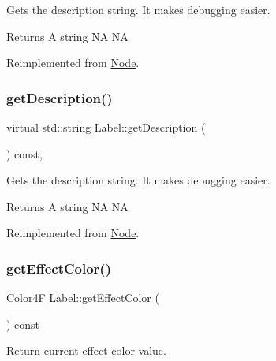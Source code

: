 Gets the description string. It makes debugging easier. \begin{DoxyReturn}{Returns}
A string  NA  NA 
\end{DoxyReturn}


Reimplemented from \hyperlink{classNode_a41710375a0d92a4ee54c39fe123b5912}{Node}.

\mbox{\label{classLabel_ae79fa577b14144f17662dd8432ecd237}} 
\subsubsection{\texorpdfstring{get\+Description()}{getDescription()}\hspace{0.1cm}{\footnotesize\ttfamily [2/2]}}
{\footnotesize\ttfamily virtual std\+::string Label\+::get\+Description (\begin{DoxyParamCaption}{ }\end{DoxyParamCaption}) const\hspace{0.3cm}{\ttfamily [override]}, {\ttfamily [virtual]}}

Gets the description string. It makes debugging easier. \begin{DoxyReturn}{Returns}
A string  NA  NA 
\end{DoxyReturn}


Reimplemented from \hyperlink{classNode_a41710375a0d92a4ee54c39fe123b5912}{Node}.

\mbox{\label{classLabel_abd570f8a274713151c9a48d2b538a625}} 
\subsubsection{\texorpdfstring{get\+Effect\+Color()}{getEffectColor()}\hspace{0.1cm}{\footnotesize\ttfamily [1/2]}}
{\footnotesize\ttfamily \hyperlink{structColor4F}{Color4F} Label\+::get\+Effect\+Color (\begin{DoxyParamCaption}{ }\end{DoxyParamCaption}) const\hspace{0.3cm}{\ttfamily [inline]}}

Return current effect color value. \mbox{\label{classLabel_abd570f8a274713151c9a48d2b538a625}} 
